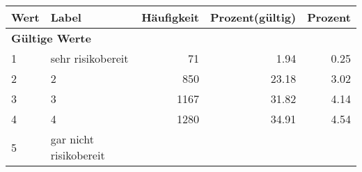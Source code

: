      \begin{longtable}{lXrrr}
     \toprule
     \textbf{Wert} & \textbf{Label} & \textbf{Häufigkeit} & \textbf{Prozent(gültig)} & \textbf{Prozent} \\
     \endhead
     \midrule
     \multicolumn{5}{l}{\textbf{Gültige Werte}}\\

     1 &
     \multicolumn{1}{X}{ sehr risikobereit   } &


       \num{71} &
       \num[round-mode=places,round-precision=2]{1,94} &
         \num[round-mode=places,round-precision=2]{0,25} \\

     2 &
     \multicolumn{1}{X}{ 2   } &


       \num{850} &
       \num[round-mode=places,round-precision=2]{23,18} &
         \num[round-mode=places,round-precision=2]{3,02} \\

     3 &
     \multicolumn{1}{X}{ 3   } &


       \num{1167} &
       \num[round-mode=places,round-precision=2]{31,82} &
         \num[round-mode=places,round-precision=2]{4,14} \\

     4 &
     \multicolumn{1}{X}{ 4   } &


       \num{1280} &
       \num[round-mode=places,round-precision=2]{34,91} &
         \num[round-mode=places,round-precision=2]{4,54} \\

     5 &
     \multicolumn{1}{X}{ gar nicht risikobereit   } &



\end{longtable}
